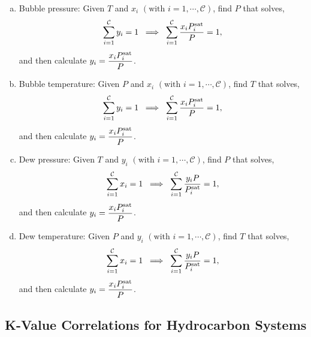 \begin{enumerate}[a)]
    \item Bubble pressure: Given $T$ and $x_{i}$ $\left(\text{with }i=1,\cdots,\mathcal{C}\right)$, find $P$ that solves,
        \begin{displaymath}
           \summation[y_{i}]{i=1}{\mathcal{C}} = 1 \;\;\Longrightarrow\;\; \summation[\frc{x_{i}P_{i}^{\text{sat}}}{P}]{i=1}{\mathcal{C}} = 1,
        \end{displaymath}
        and then calculate $y_{i}= \frc{x_{i}P_{i}^{\text{sat}}}{P}$.
        
    \item Bubble temperature: Given $P$ and $x_{i}$ $\left(\text{with }i=1,\cdots,\mathcal{C}\right)$, find $T$ that solves,
        \begin{displaymath}
           \summation[y_{i}]{i=1}{\mathcal{C}} = 1 \;\;\Longrightarrow\;\; \summation[\frc{x_{i}P_{i}^{\text{sat}}}{P}]{i=1}{\mathcal{C}} = 1,
        \end{displaymath}
        and then calculate $y_{i}= \frc{x_{i}P_{i}^{\text{sat}}}{P}$.
      
    \item Dew pressure: Given $T$ and $y_{i}$ $\left(\text{with }i=1,\cdots,\mathcal{C}\right)$, find $P$ that solves,
        \begin{displaymath}
           \summation[x_{i}]{i=1}{\mathcal{C}} = 1 \;\;\Longrightarrow\;\; \summation[\frc{y_{i}P}{P_{i}^{\text{sat}}}]{i=1}{\mathcal{C}} = 1,
        \end{displaymath}
        and then calculate $y_{i}= \frc{x_{i}P_{i}^{\text{sat}}}{P}$.
      
    \item Dew temperature: Given $P$ and $y_{i}$ $\left(\text{with }i=1,\cdots,\mathcal{C}\right)$, find $T$ that solves,
        \begin{displaymath}
           \summation[x_{i}]{i=1}{\mathcal{C}} = 1 \;\;\Longrightarrow\;\; \summation[\frc{y_{i}P}{P_{i}^{\text{sat}}}]{i=1}{\mathcal{C}} = 1,
        \end{displaymath}
        and then calculate $y_{i}= \frc{x_{i}P_{i}^{\text{sat}}}{P}$.
\end{enumerate}


\subsection{K-Value Correlations for Hydrocarbon Systems}


